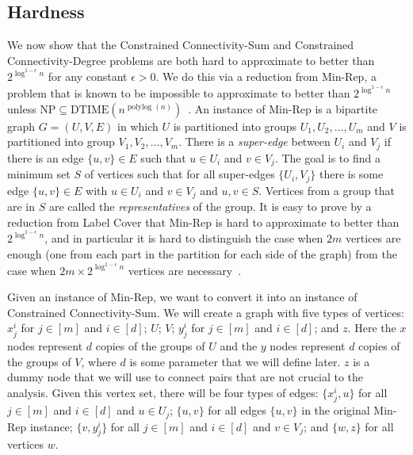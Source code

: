 \documentclass[11pt,letterpaper]{article}
\theoremstyle{definition}
\def\polylog{\operatorname{polylog}}
\begin{document}
\subsection{Hardness}
We now show that the {\sc Constrained Connectivity-Sum} and {\sc
  Constrained Connectivity-Degree} problems are both hard to approximate to better than
$2^{\log^{1-\epsilon} n}$ for any constant $\epsilon > 0$.  We do this via a reduction from {\sc
  Min-Rep}, a problem that is known to be impossible to approximate to
better than $2^{\log^{1-\epsilon} n}$ unless $\text{NP} \subseteq
\text{DTIME}(n^{\polylog(n)})$~\cite{Kortsarz:99}. An instance of {\sc
  Min-Rep} is a bipartite graph $G = (U,V,E)$ in which $U$ is
partitioned into groups $U_1, U_2, \dots, U_m$ and $V$ is partitioned
into group $V_1, V_2, \dots, V_m$.  There is a \emph{super-edge}
between $U_i$ and $V_j$ if there is an edge $\{u,v\} \in E$ such that
$u \in U_i$ and $v \in V_j$.  The goal is to find a minimum set $S$ of
vertices such that for all super-edges $\{U_i, V_j\}$ there is some
edge $\{u,v\} \in E$ with $u \in U_i$ and $v \in V_j$ and $u,v \in S$.  Vertices from a group that are in $S$ are called the \emph{representatives} of the group.
It is easy to prove by a reduction from {\sc Label Cover} that {\sc
  Min-Rep} is hard to approximate to better than $2^{\log^{1-\epsilon}
  n}$, and in particular it is hard to distinguish the case when $2m$
vertices are enough (one from each part in the partition for each side
of the graph) from the case when $2m \times 2^{\log^{1-\epsilon}n}$
vertices are necessary~\cite{Kortsarz:99}.

Given an instance of {\sc Min-Rep}, we want to convert it into an
instance of {\sc Constrained Connectivity-Sum}.  We will create a graph
with five types of vertices: $x_j^i$ for $j \in [m]$ and $i \in [d]$; $U$; $V$; $y_j^i$ for $j \in [m]$ and $i \in [d]$; and $z$.
Here the $x$ nodes represent $d$ copies of the groups of $U$ and the
$y$ nodes represent $d$ copies of the groups of $V$, where $d$ is some
parameter that we will define later.  $z$ is a dummy node that we will
use to connect pairs that are not crucial to the analysis.  Given
this vertex set, there will be four types of edges: $\{x_j^i, u\}$ for all $j \in [m]$ and $i \in [d]$ and $u \in
  U_j$; $\{u,v\}$ for all edges $\{u,v\}$ in the original {\sc Min-Rep}
  instance; $\{v, y_j^i\}$ for all $j \in [m]$ and $i \in [d]$ and $v \in
  V_j$; and $\{w,z\}$ for all vertices $w$.
\end{document}
